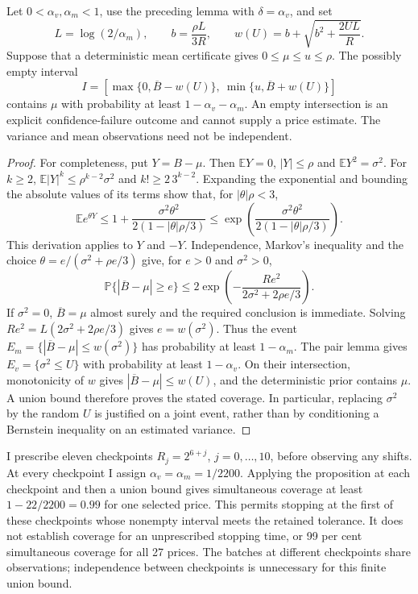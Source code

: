 \begin{proposition}
\label{prop:rqmc-mean-confidence}
Let $0<\alpha_v,\alpha_m<1$, use the preceding lemma with
$\delta=\alpha_v$, and set
\[
 L=\log(2/\alpha_m),\qquad b=\frac{\rho L}{3R},\qquad
 w(U)=b+\sqrt{b^2+\frac{2UL}{R}}.
\]
Suppose that a deterministic mean certificate gives $0\leq\mu\leq u\leq\rho$.
The possibly empty interval
\[
 I=[\max\{0,\overline B-w(U)\},\ \min\{u,\overline B+w(U)\}]
\]
contains $\mu$ with probability at least $1-\alpha_v-\alpha_m$. An empty
intersection is an explicit confidence-failure outcome and cannot supply a
price estimate. The variance and mean observations need not be independent.
\end{proposition}

\begin{proof}
For completeness, put $Y=B-\mu$. Then $\mathbb E Y=0$, $|Y|\leq\rho$ and
$\mathbb E Y^2=\sigma^2$. For $k\geq2$,
$\mathbb E|Y|^k\leq\rho^{k-2}\sigma^2$ and
$k!\geq2\,3^{k-2}$. Expanding the exponential and bounding the absolute
values of its terms show that, for $|\theta|\rho<3$,
\[
 \mathbb E e^{\theta Y}
 \leq 1+\frac{\sigma^2\theta^2}{2(1-|\theta|\rho/3)}
 \leq\exp\!\left(\frac{\sigma^2\theta^2}{2(1-|\theta|\rho/3)}\right).
\]
This derivation applies to $Y$ and $-Y$. Independence, Markov's inequality
and the choice $\theta=e/(\sigma^2+\rho e/3)$ give, for $e>0$ and
$\sigma^2>0$,
\[
 \mathbb P\{|\overline B-\mu|\geq e\}
 \leq2\exp\!\left(-\frac{Re^2}{2\sigma^2+2\rho e/3}\right).
\]
If $\sigma^2=0$, $\overline B=\mu$ almost surely and the required conclusion
is immediate. Solving $Re^2=L(2\sigma^2+2\rho e/3)$ gives $e=w(\sigma^2)$.
Thus the event
$E_m=\{|\overline B-\mu|\leq w(\sigma^2)\}$ has probability at least
$1-\alpha_m$. The pair lemma gives
$E_v=\{\sigma^2\leq U\}$ with probability at least $1-\alpha_v$.
On their intersection, monotonicity of $w$ gives
$|\overline B-\mu|\leq w(U)$, and the deterministic prior contains $\mu$.
A union bound therefore proves the stated coverage. In particular, replacing
$\sigma^2$ by the random $U$ is justified on a joint event, rather than by
conditioning a Bernstein inequality on an estimated variance.
\end{proof}

I prescribe eleven checkpoints $R_j=2^{6+j}$, $j=0,\ldots,10$, before
observing any shifts. At every checkpoint I assign
$\alpha_v=\alpha_m=1/2200$. Applying the proposition at each checkpoint
and then a union bound gives simultaneous coverage at least
$1-22/2200=0.99$ for one selected price. This permits stopping at the first
of these checkpoints whose nonempty interval meets the retained tolerance.
It does not establish coverage for an unprescribed stopping time, or
99 per cent simultaneous coverage for all 27 prices. The batches at different
checkpoints share observations; independence between checkpoints is unnecessary
for this finite union bound.

